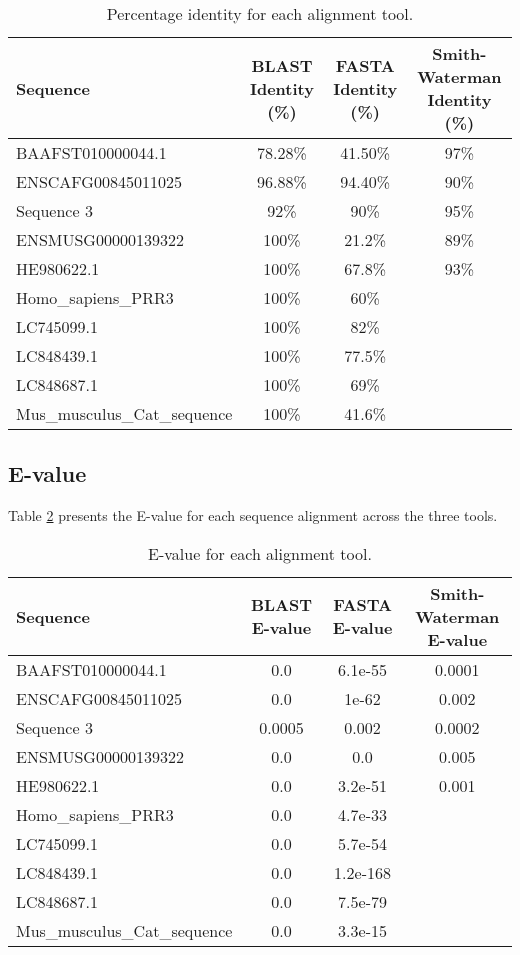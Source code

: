 \documentclass[a4paper,12pt]{article}
\begin{document}
\begin{table}[h!]
\centering
\begin{tabular}{|l|c|c|c|}
    \hline
    \textbf{Sequence} & \textbf{BLAST Identity (\%)} & \textbf{FASTA Identity (\%)} & \textbf{Smith-Waterman Identity (\%)} \\
    \hline
    BAAFST010000044.1 & 78.28\% & 41.50\% & 97\% \\
    ENSCAFG00845011025 & 96.88\% & 94.40\%& 90\% \\
    Sequence 3 & 92\% & 90\% & 95\% \\
    ENSMUSG00000139322& 100\%& 21.2\%& 89\% \\
    HE980622.1& 100\%& 67.8\%& 93\% \\
    Homo_sapiens_PRR3& 100\%& 60\%&\\
    LC745099.1& 100\%& 82\%&\\
    LC848439.1& 100\%& 77.5\%&\\
    LC848687.1& 100\%& 69\%&\\
    Mus_musculus_Cat_sequence& 100\%& 41.6\%&\\
    \hline
\end{tabular}
\caption{Percentage identity for each alignment tool.}
\label{table:identity}
\end{table}

\subsection{E-value}
Table \ref{table:evalue} presents the E-value for each sequence alignment across the three tools.

\begin{table}[h!]
\centering
\begin{tabular}{|l|c|c|c|}
    \hline
    \textbf{Sequence} & \textbf{BLAST E-value} & \textbf{FASTA E-value} & \textbf{Smith-Waterman E-value} \\
    \hline
    BAAFST010000044.1 & 0.0 & 6.1e-55 & 0.0001 \\
    ENSCAFG00845011025 & 0.0 & 1e-62 & 0.002 \\
    Sequence 3 & 0.0005 & 0.002 & 0.0002 \\
    ENSMUSG00000139322& 0.0& 0.0& 0.005 \\
    HE980622.1& 0.0& 3.2e-51& 0.001 \\
    Homo_sapiens_PRR3& 0.0& 4.7e-33&\\
    LC745099.1& 0.0& 5.7e-54&\\
    LC848439.1& 0.0& 1.2e-168&\\
    LC848687.1& 0.0& 7.5e-79&\\
    Mus_musculus_Cat_sequence& 0.0& 3.3e-15&\\
    \hline
\end{tabular}
\caption{E-value for each alignment tool.}
\label{table:evalue}
\end{table}
\end{document}
